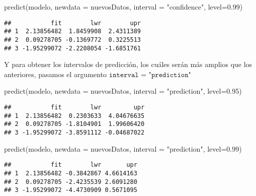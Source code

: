 \documentclass[
]{article}
\newenvironment{Shaded}{\begin{snugshade}}{\end{snugshade}}
\newcommand{\AttributeTok}[1]{\textcolor[rgb]{0.77,0.63,0.00}{#1}}
\newcommand{\FloatTok}[1]{\textcolor[rgb]{0.00,0.00,0.81}{#1}}
\newcommand{\FunctionTok}[1]{\textcolor[rgb]{0.00,0.00,0.00}{#1}}
\newcommand{\NormalTok}[1]{#1}
\newcommand{\StringTok}[1]{\textcolor[rgb]{0.31,0.60,0.02}{#1}}
\begin{document}
\begin{Shaded}
\begin{Highlighting}[]
\FunctionTok{predict}\NormalTok{(modelo, }\AttributeTok{newdata =}\NormalTok{ nuevosDatos, }\AttributeTok{interval =} \StringTok{"confidence"}\NormalTok{, }\AttributeTok{level=}\FloatTok{0.99}\NormalTok{)}
\end{Highlighting}
\end{Shaded}

\begin{verbatim}
##           fit        lwr        upr
## 1  2.13856482  1.8459908  2.4311389
## 2  0.09278705 -0.1369772  0.3225513
## 3 -1.95299072 -2.2208054 -1.6851761
\end{verbatim}

Y para obtener los intervalos de predicción, los cuáles serán más
amplios que los anteriores, pasamos el argumento
\(\texttt{interval = "prediction"}\)

\begin{Shaded}
\begin{Highlighting}[]
\FunctionTok{predict}\NormalTok{(modelo, }\AttributeTok{newdata =}\NormalTok{ nuevosDatos, }\AttributeTok{interval =} \StringTok{"prediction"}\NormalTok{, }\AttributeTok{level=}\FloatTok{0.95}\NormalTok{)}
\end{Highlighting}
\end{Shaded}

\begin{verbatim}
##           fit        lwr         upr
## 1  2.13856482  0.2303633  4.04676635
## 2  0.09278705 -1.8104901  1.99606420
## 3 -1.95299072 -3.8591112 -0.04687022
\end{verbatim}

\begin{Shaded}
\begin{Highlighting}[]
\FunctionTok{predict}\NormalTok{(modelo, }\AttributeTok{newdata =}\NormalTok{ nuevosDatos, }\AttributeTok{interval =} \StringTok{"prediction"}\NormalTok{, }\AttributeTok{level=}\FloatTok{0.99}\NormalTok{)}
\end{Highlighting}
\end{Shaded}

\begin{verbatim}
##           fit        lwr       upr
## 1  2.13856482 -0.3842867 4.6614163
## 2  0.09278705 -2.4235539 2.6091280
## 3 -1.95299072 -4.4730909 0.5671095
\end{verbatim}
\end{document}
